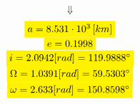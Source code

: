 \documentclass[11pt, a4paper]{article}
\begin{document}
$$\Downarrow$$
\begin{equation}
\begin{matrix}
    \colorbox{yellow}{$a = 8.531\cdot10^3\left[km\right]$}\\
    \colorbox{yellow}{$e = 0.1998$}\\
    \colorbox{yellow}{$i = 2.0942[rad] = 119.9888^\circ$}\\
    \colorbox{yellow}{$\Omega = 1.0391 [rad] = 59.5303^\circ$}\\
    \colorbox{yellow}{$\omega = 2.633 [rad] = 150.8598^\circ$}
\end{matrix}
\end{equation}

\newpage


\end{document}
